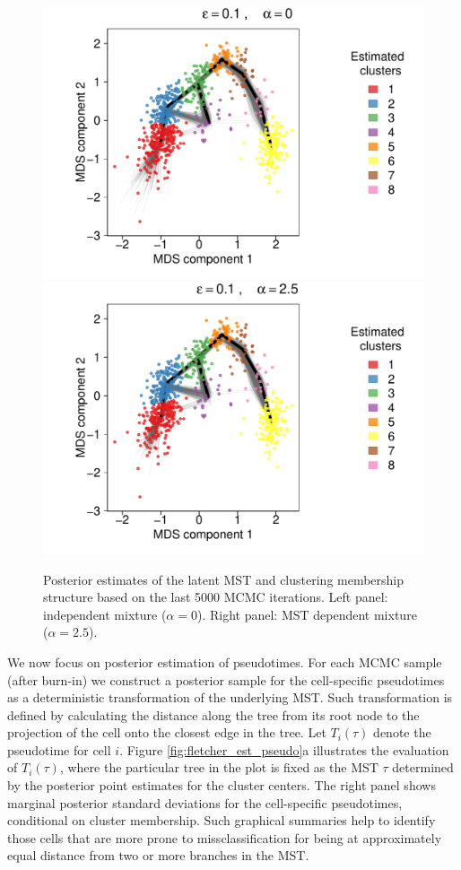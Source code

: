 \begin{figure}[!ht]
  \centering
  \includegraphics[width=.49\linewidth]{./Img/fletcher/estimated_trees_slingshot_eps_01_xi_0.pdf}
  \includegraphics[width=.49\linewidth]{./Img/fletcher/estimated_trees_slingshot_eps_01_xi_25.pdf}
\caption{Posterior estimates of the latent MST and clustering membership structure based on the last 5000 MCMC iterations. Left panel: independent mixture ($\alpha = 0$). Right panel: MST dependent mixture ($\alpha=2.5$).}
\label{fig:fletcher_est_tree}
\end{figure}



We now focus on posterior estimation of pseudotimes. For each MCMC
sample (after burn-in) we construct a posterior sample for the
cell-specific pseudotimes as a deterministic transformation 
of the underlying MST. Such transformation is defined by calculating the
distance along the tree from its root node to the projection of the
cell onto the closest edge in the tree. 
 Let $T_i(\tau)$ denote the pseudotime for cell $i$. 
Figure \ref{fig:fletcher_est_pseudo}a
illustrates the evaluation of $T_i(\tau)$, 
where the
particular tree in the plot is fixed as the MST $\tau$ determined by the
posterior point estimates for the cluster centers. 
The right panel shows marginal posterior standard deviations for the
cell-specific pseudotimes,  conditional on cluster membership. 
Such graphical summaries help to identify those cells
that are more prone to missclassification for being at approximately
equal distance from two or more branches in the MST. 

